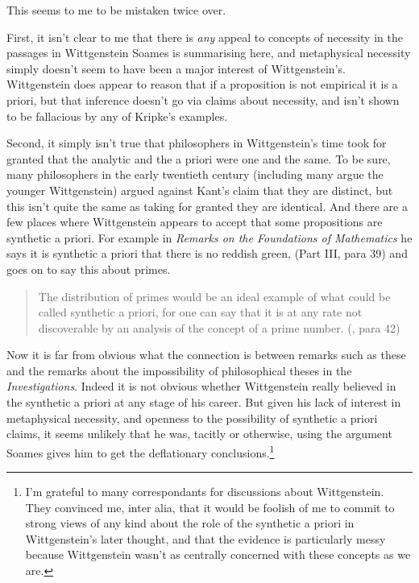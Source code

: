 \documentclass[
  10pt,
  letterpaper,
  DIV=11,
  numbers=noendperiod,
  twoside]{scrartcl}
\begin{document}
This seems to me to be mistaken twice over.

First, it isn't clear to me that there is \emph{any} appeal to concepts
of necessity in the passages in Wittgenstein Soames is summarising here,
and metaphysical necessity simply doesn't seem to have been a major
interest of Wittgenstein's. Wittgenstein does appear to reason that if a
proposition is not empirical it is a priori, but that inference doesn't
go via claims about necessity, and isn't shown to be fallacious by any
of Kripke's examples.

Second, it simply isn't true that philosophers in Wittgenstein's time
took for granted that the analytic and the a priori were one and the
same. To be sure, many philosophers in the early twentieth century
(including many argue the younger Wittgenstein) argued against Kant's
claim that they are distinct, but this isn't quite the same as taking
for granted they are identical. And there are a few places where
Wittgenstein appears to accept that some propositions are synthetic a
priori. For example in \emph{Remarks on the Foundations of Mathematics}
he says it is synthetic a priori that there is no reddish green, (Part
III, para 39) and goes on to say this about primes.

\begin{quote}
The distribution of primes would be an ideal example of what could be
called synthetic a priori, for one can say that it is at any rate not
discoverable by an analysis of the concept of a prime number.
(, para 42)
\end{quote}

Now it is far from obvious what the connection is between remarks such
as these and the remarks about the impossibility of philosophical theses
in the \emph{Investigations}. Indeed it is not obvious whether
Wittgenstein really believed in the synthetic a priori at any stage of
his career. But given his lack of interest in metaphysical necessity,
and openness to the possibility of synthetic a priori claims, it seems
unlikely that he was, tacitly or otherwise, using the argument Soames
gives him to get the deflationary conclusions.\footnote{I'm grateful to
  many correspondants for discussions about Wittgenstein. They convinced
  me, inter alia, that it would be foolish of me to commit to strong
  views of any kind about the role of the synthetic a priori in
  Wittgenstein's later thought, and that the evidence is particularly
  messy because Wittgenstein wasn't as centrally concerned with these
  concepts as we are.}
\end{document}
